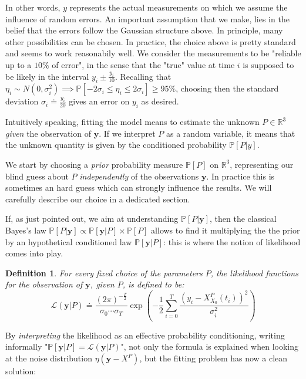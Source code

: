 \documentclass[8pt]{article}
\newtheorem{definition}{Definition}
\begin{document}
In other words, $y$ represents the actual measurements on which we
assume the influence of random errors. An important assumption that
we make, lies in the belief that the errors follow the
Gaussian structure above. In principle, many other possibilities
can be chosen.
In practice, the choice above is pretty standard and 
seems to work reasonabily well.
We consider the measurements
to be "reliable up to a $10\%$ of error", in the sense that
the "true" value at time $i$ is supposed to be likely in the interval
$y_i \pm \frac{y_i}{10}$.
Recalling that
$\eta_i \sim N(0, \sigma_i^2) \implies 
\mathbb{P}[ - 2 \sigma_i \leq \eta_i \leq 2 \sigma_i] \geq 95\%$, choosing
then the standard deviation
$\sigma_i \doteq \frac{y_i}{20}$ gives an error on $y_i$ as desired.


Intuitively speaking, fitting the model means to estimate
the unknown $P \in \mathbb{R}^3$ \emph{given} the observation of $\textbf{y}$.
If we interpret $P$ as a random variable, it means that 
the unknown quantity is given by the conditioned
probability $\mathbb{P}[P | y]$.


We start by choosing a \emph{prior} probability measure $\mathbb{P}[P]$ on 
$\mathbb{R}^3$, representing our blind guess about 
$P$ \emph{independently} of the 
observations $\textbf{y}$. In practice this is sometimes an hard guess
which can strongly influence the results.
We will carefully describe our choice in a dedicated section.


If, as just pointed out, we aim at understanding 
$\mathbb{P}[P | \textbf{y}]$, then the classical Bayes's law
$\mathbb{P}[P | \textbf{y}] \propto
	\mathbb{P}[\textbf{y} | P] \times \mathbb{P}[P]$
allows to find it multiplying the the prior  
by an hypothetical conditioned law $\mathbb{P}[\textbf{y} | P]$: this
is where the notion of likelihood comes into play.


\begin{definition}
For every fixed choice of the parameters $P$, the likelihood functions
for the observation of $\textbf{y}$, given $P$, is defined to be:
	\begin{equation}
	\mathcal{L}(\textbf{y}|P) \doteq 
		\frac{(2 \pi)^{- \frac{T}{2}}}
		{\sigma_0\cdots\sigma_{T}}
		\exp \left( -\frac{1}{2} 
		\sum_{i=0}^{T} 
		\frac{(y_i - X_{X_0}^P(t_i))^2}
		{\sigma_i^2}
		\right )
	\end{equation}
\end{definition}


By \emph{interpreting} the likelihood as an effective probability
conditioning, writing informally 
"$\mathbb{P}[\textbf{y}|P] = \mathcal{L}(\textbf{y}|P)$",
not only 
the formula is explained when looking at the noise
distribution $\eta(\textbf{y} - X^P)$, but the 
fitting problem has now a clean solution:
\end{document}
